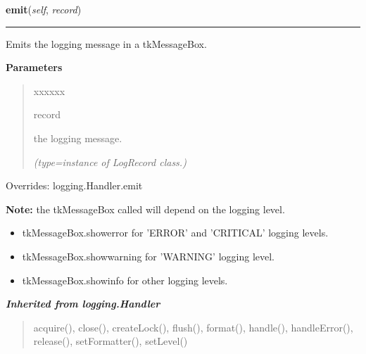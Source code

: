 \hspace{.8\funcindent}\begin{boxedminipage}{\funcwidth}

    \raggedright \textbf{emit}(\textit{self}, \textit{record})

    \vspace{-1.5ex}

    \rule{\textwidth}{0.5\fboxrule}
\setlength{\parskip}{2ex}
    Emits the logging message in a tkMessageBox.

\setlength{\parskip}{1ex}
      \textbf{Parameters}
      \vspace{-1ex}

      \begin{quote}
        \begin{Ventry}{xxxxxx}

          \item[record]

          the logging message.

            {\it (type=instance of LogRecord class.)}

        \end{Ventry}

      \end{quote}

      Overrides: logging.Handler.emit

\textbf{Note:} the tkMessageBox called will depend on the logging level.

\begin{itemize}
\setlength{\parskip}{0.6ex}
  \item tkMessageBox.showerror for 'ERROR' and 'CRITICAL' logging levels.

  \item tkMessageBox.showwarning for 'WARNING' logging level.

  \item tkMessageBox.showinfo for other logging levels.

\end{itemize}



    \end{boxedminipage}


\large{\textbf{\textit{Inherited from logging.Handler}}}

\begin{quote}
acquire(), close(), createLock(), flush(), format(), handle(), handleError(), release(), setFormatter(), setLevel()
\end{quote}


